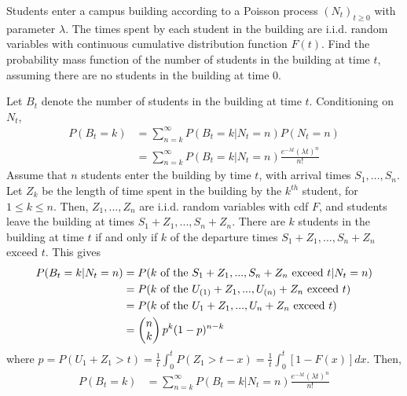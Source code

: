 \documentclass[11pt]{elegantbook}
\begin{document}
\begin{example}
Students enter a campus building according to a Poisson process $(N_t)_{t\geq 0}$ with parameter $\lambda$. The times spent by each student in the building are i.i.d. random variables with continuous cumulative distribution function $F(t)$. Find the probability mass function of the number of students in the building at time $t$, assuming there are no students in the building at time $0$.
\begin{solution}
Let $B_t$ denote the number of students in the building at time $t$. Conditioning on $N_t$,
\begin{equation}
    \begin{aligned}
        P(B_t=k)&=\sum_{n=k}^\infty P(B_t=k|N_t=n)P(N_t=n)\\
        &=\sum_{n=k}^\infty P(B_t=k|N_t=n)\frac{e^{-\lambda t}(\lambda t)^n}{n!}
    \end{aligned}
    \nonumber
\end{equation}
Assume that $n$ students enter the building by time $t$, with arrival times $S_1,...,S_n$. Let $Z_k$ be the length of time spent in the building by the $k^{th}$ student, for $1\leq k\leq n$. Then, $Z_1,...,Z_n$ are i.i.d. random variables with cdf $F$, and students leave the building at times $S_1+Z_1,...,S_n+Z_n$. There are $k$ students in the building at time $t$ if and only if $k$ of the departure times $S_1+Z_1,...,S_n+Z_n$ exceed $t$. This gives
\begin{equation}
    \begin{aligned}
        P(B_t=k|N_t=n)&=P(k\textnormal{ of the }S_1+Z_1,...,S_n+Z_n\textnormal{ exceed }t|N_t=n)\\
        &=P(k\textnormal{ of the }U_{(1)}+Z_1,...,U_{(n)}+Z_n\textnormal{ exceed }t)\\
        &=P(k\textnormal{ of the }U_{1}+Z_1,...,U_{n}+Z_n\textnormal{ exceed }t)\\
        &=\begin{pmatrix}
            n\\
            k
        \end{pmatrix}p^k(1-p)^{n-k}
    \end{aligned}
    \nonumber
\end{equation}
where $p=P(U_1+Z_1>t)=\frac{1}{t}\int_{0}^tP(Z_1>t-x)=\frac{1}{t}\int_{0}^t[1-F(x)]dx$. Then,
\begin{equation}
    \begin{aligned}
        P(B_t=k)
        &=\sum_{n=k}^\infty P(B_t=k|N_t=n)\frac{e^{-\lambda t}(\lambda t)^n}{n!}\\

\end{aligned}
\end{equation}
\end{solution}
\end{example}
\end{document}
